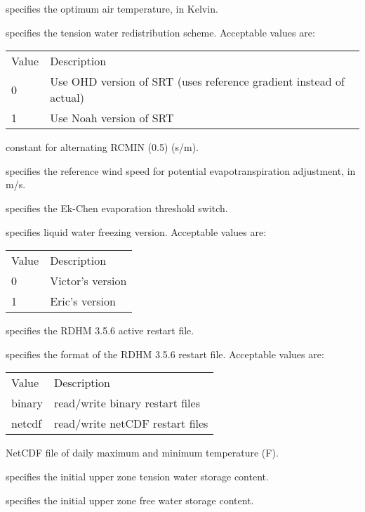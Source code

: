   specifies the optimum air temperature,
 in Kelvin.

  specifies the tension water redistribution
 scheme.
 Acceptable values are:

 \begin{tabular}{ll}
 Value & Description             \\
 0     & Use OHD version of SRT (uses reference gradient instead
         of actual)              \\
 1     & Use Noah version of SRT \\
 \end{tabular}

  constant for alternating
 RCMIN (0.5) (s/m).

  specifies the reference wind speed
 for potential evapotranspiration adjustment, in m/s.

  specifies the Ek-Chen evaporation
 threshold switch.

  specifies liquid water freezing
 version.
 Acceptable values are:

 \begin{tabular}{ll}
 Value & Description      \\
 0     & Victor's version \\
 1     & Eric's version   \\
 \end{tabular}

  specifies the RDHM 3.5.6 active
 restart file.

  specifies the format of
 the RDHM 3.5.6 restart file.
 Acceptable values are:

 \begin{tabular}{ll}
 Value  & Description                     \\
 binary & read/write binary restart files \\
 netcdf & read/write netCDF restart files \\
 \end{tabular}

  NetCDF file of daily maximum and
 minimum temperature (F).

  specifies the initial
 upper zone tension water storage content.

  specifies the initial
 upper zone free water storage content.

